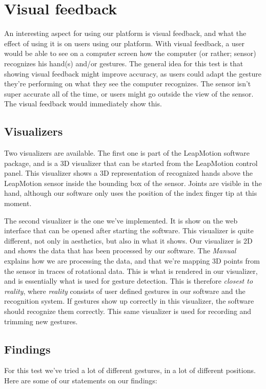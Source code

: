 \documentclass[a4paper]{article}
\begin{document}
  \clearpage

  \section*{Visual feedback}
  An interesting aspect for using our platform is visual feedback, and what the
  effect of using it is on users using our platform. With visual feedback, a
  user would be able to see on a computer screen how the computer (or rather;
  sensor) recognizes his hand(s) and/or gestures. The general idea for this test
  is that showing visual feedback might improve accuracy, as users could adapt
  the gesture they're performing on what they see the computer recognizes.
  The sensor isn't super accurate all of the time, or users might go outside the
  view of the sensor. The visual feedback would immediately show this.

  \subsection*{Visualizers}
  Two visualizers are available. The first one is part of the LeapMotion
  software package, and is a 3D visualizer that can be started from the
  LeapMotion control panel. This visualizer shows a 3D representation of
  recognized hands above the LeapMotion sensor inside the bounding box of the
  sensor. Joints are visible in the hand, although our software only uses the
  position of the index finger tip at this moment.

  The second visualizer is the one we've implemented. It is show on the web
  interface that can be opened after starting the software. This visualizer is
  quite different, not only in aesthetics, but also in what it shows. Our
  visualizer is 2D and shows the data that has been processed by our software.
  The \emph{Manual} explains how we are processing the data, and that we're
  mapping 3D points from the sensor in traces of rotational data. This is what
  is rendered in our visualizer, and is essentially what is used for gesture
  detection. This is therefore \emph{closest to reality}, where \emph{reality}
  consists of user defined gestures in our software and the recognition system.
  If gestures show up correctly in this visualizer, the software should
  recognize them correctly. This same visualizer is used for recording and
  trimming new gestures.

  \subsection*{Findings}
  For this test we've tried a lot of different gestures, in a lot of different
  positions. Here are some of our statements on our findings:
\end{document}
